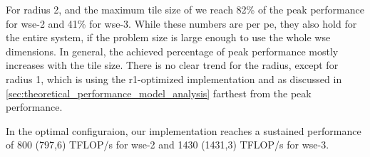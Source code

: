 For radius 2, and the maximum tile size of  we reach \num{82}\% of the peak performance for \ac{wse}-2 and \num{41}\% for \ac{wse}-3.
While these numbers are per \ac{pe}, they also hold for the entire system, if the problem size is large enough to use the whole \ac{wse} dimensions.
In general, the achieved percentage of peak performance mostly increases with the tile size. There is no clear trend for the radius, except for radius 1, which is using the r1-optimized implementation and as discussed in \autoref{sec:theoretical_performance_model_analysis} farthest from the peak performance.

In the optimal configuraion, our implementation reaches a sustained performance of 800 (797,6) TFLOP/s for \ac{wse}-2 and 1430 (1431,3) TFLOP/s for \ac{wse}-3.